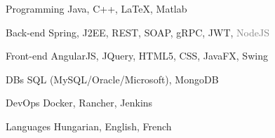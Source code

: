 

\begin{cvskills}


  \cvskill
    {Programming} %
    {Java, C++, LaTeX, Matlab} %

  \cvskill
    {Back-end} %
    {Spring, J2EE, REST, SOAP, gRPC, JWT, \textcolor{gray}{NodeJS}} %

  \cvskill
    {Front-end} %
    {AngularJS, JQuery, HTML5, CSS, JavaFX, Swing} %
	
	  
  \cvskill
    {DBs} %
    {SQL (MySQL/Oracle/Microsoft), MongoDB} %


  \cvskill
    {DevOps} %
    {Docker, Rancher, Jenkins} %

  \cvskill
    {Languages} %
    {Hungarian, English, French} %

\end{cvskills}
